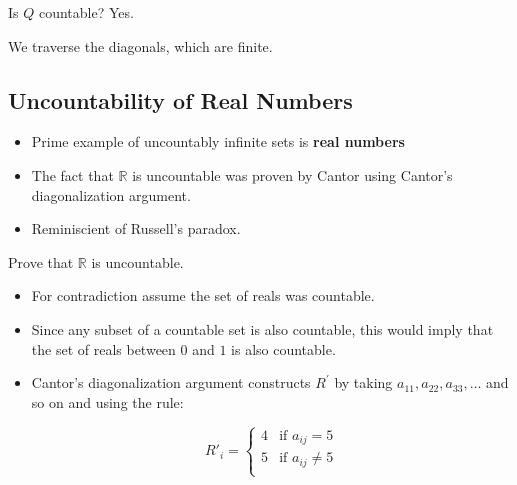 \documentclass{scrreprt}
\begin{document}
\begin{example}
	Is $Q$ countable? Yes.

	We traverse the diagonals, which are finite.

	

\end{example}

\subsection{Uncountability of Real Numbers}

\begin{itemize}
	\item Prime example of uncountably infinite sets is \textbf{real numbers}
	\item The fact that $\mathbb{R}$ is uncountable was proven by Cantor using Cantor's diagonalization argument.
	\item Reminiscient of Russell's paradox.
\end{itemize}

\begin{example}
	Prove that $\mathbb{R}$ is uncountable.

	\begin{itemize}
		\item For contradiction assume the set of reals was countable.
		\item Since any subset of a countable set is also countable, this would
		      imply that the set of reals between $0$ and $1$ is also countable.
		\item Cantor's diagonalization argument constructs $R^\prime$ by taking
		      $a_11, a_22, a_33, \ldots$ and so on and using the rule:

		      \[
			      R'_i = \begin{cases}
				      4 & \text{if } a_{ij} = 5    \\
				      5 & \text{if } a_{ij} \neq 5 \\
			      \end{cases}
		      \]
	\end{itemize}
\end{example}
\end{document}
